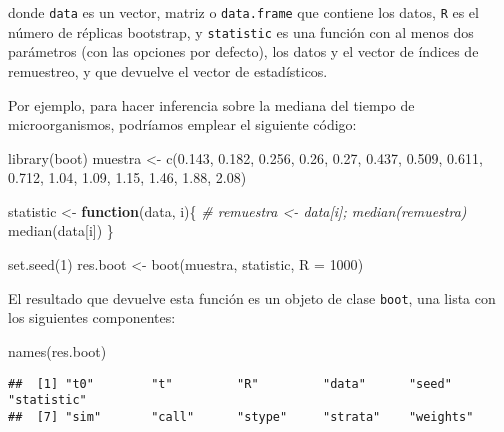 \documentclass[
]{book}
\newenvironment{Shaded}{\begin{snugshade}}{\end{snugshade}}
\newcommand{\AttributeTok}[1]{\textcolor[rgb]{0.77,0.63,0.00}{#1}}
\newcommand{\CommentTok}[1]{\textcolor[rgb]{0.56,0.35,0.01}{\textit{#1}}}
\newcommand{\ControlFlowTok}[1]{\textcolor[rgb]{0.13,0.29,0.53}{\textbf{#1}}}
\newcommand{\DecValTok}[1]{\textcolor[rgb]{0.00,0.00,0.81}{#1}}
\newcommand{\FloatTok}[1]{\textcolor[rgb]{0.00,0.00,0.81}{#1}}
\newcommand{\FunctionTok}[1]{\textcolor[rgb]{0.00,0.00,0.00}{#1}}
\newcommand{\NormalTok}[1]{#1}
\newcommand{\OtherTok}[1]{\textcolor[rgb]{0.56,0.35,0.01}{#1}}
\theoremstyle{break}
\theoremstyle{definition}
\theoremstyle{definition}
\theoremstyle{definition}
\theoremstyle{definition}
\theoremstyle{remark}
\begin{document}
donde \texttt{data} es un vector, matriz o \texttt{data.frame} que contiene los datos,
\texttt{R} es el número de réplicas bootstrap, y \texttt{statistic} es una función
con al menos dos parámetros (con las opciones por defecto),
los datos y el vector de índices de remuestreo,
y que devuelve el vector de estadísticos.

Por ejemplo, para hacer inferencia sobre la mediana del tiempo de microorganismos,
podríamos emplear el siguiente código:

\begin{Shaded}
\begin{Highlighting}[]
\FunctionTok{library}\NormalTok{(boot)}
\NormalTok{muestra }\OtherTok{\textless{}{-}} \FunctionTok{c}\NormalTok{(}\FloatTok{0.143}\NormalTok{, }\FloatTok{0.182}\NormalTok{, }\FloatTok{0.256}\NormalTok{, }\FloatTok{0.26}\NormalTok{, }\FloatTok{0.27}\NormalTok{, }\FloatTok{0.437}\NormalTok{, }\FloatTok{0.509}\NormalTok{, }
             \FloatTok{0.611}\NormalTok{, }\FloatTok{0.712}\NormalTok{, }\FloatTok{1.04}\NormalTok{, }\FloatTok{1.09}\NormalTok{, }\FloatTok{1.15}\NormalTok{, }\FloatTok{1.46}\NormalTok{, }\FloatTok{1.88}\NormalTok{, }\FloatTok{2.08}\NormalTok{)}

\NormalTok{statistic }\OtherTok{\textless{}{-}} \ControlFlowTok{function}\NormalTok{(data, i)\{}
  \CommentTok{\# remuestra \textless{}{-} data[i]; median(remuestra)}
  \FunctionTok{median}\NormalTok{(data[i])}
\NormalTok{\}}

\FunctionTok{set.seed}\NormalTok{(}\DecValTok{1}\NormalTok{)}
\NormalTok{res.boot }\OtherTok{\textless{}{-}} \FunctionTok{boot}\NormalTok{(muestra, statistic, }\AttributeTok{R =} \DecValTok{1000}\NormalTok{)}
\end{Highlighting}
\end{Shaded}

El resultado que devuelve esta función es un objeto de clase \texttt{boot}, una lista con los siguientes componentes:

\begin{Shaded}
\begin{Highlighting}[]
\FunctionTok{names}\NormalTok{(res.boot)}
\end{Highlighting}
\end{Shaded}

\begin{verbatim}
##  [1] "t0"        "t"         "R"         "data"      "seed"      "statistic"
##  [7] "sim"       "call"      "stype"     "strata"    "weights"
\end{verbatim}
\end{document}
